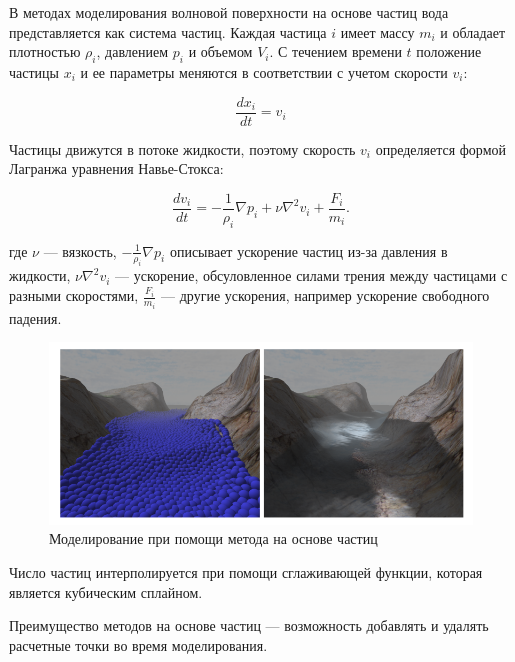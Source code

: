 В методах моделирования волновой поверхности на основе частиц вода представляется как система частиц. Каждая частица $i$ имеет массу $m_{i}$ и обладает плотностью $\rho _{i}$, давлением $p_{i}$ и объемом $V_{i}$. С течением времени $t$ положение частицы $x_{i}$ и ее параметры меняются в соответствии с учетом скорости $v_{i}$:

\begin{equation}
    \label{vi}
    \frac{dx_{i}}{dt} = v_{i}
\end{equation}

Частицы движутся в потоке жидкости, поэтому скорость $v_{i}$ определяется формой Лагранжа уравнения Навье-Стокса:

\begin{equation}
    \label{dv}
    \frac{dv_{i}}{dt} = -\frac{1}{\rho _{i}} \nabla p_{i} + \nu \nabla ^2 v_{i} + \frac{F_{i}}{m_{i}}.
\end{equation}

где $\nu$ --- вязкость, $-\frac{1}{\rho _{i}} \nabla p_{i}$ описывает ускорение частиц из-за давления в жидкости, $\nu \nabla ^2 v_{i}$ --- ускорение, обсуловленное силами трения между частицами с разными скоростями, $\frac{F_{i}}{m_{i}}$ --- другие ускорения, например ускорение свободного падения.

\begin{figure}[H]
	\begin{center}
		\includegraphics[scale=0.5]{img/particle.png}
	\end{center}
	\captionsetup{justification=centering}
	\caption{Моделирование при помощи метода на основе частиц}
	\label{img:particle}
\end{figure}

Число частиц интерполируется при помощи сглаживающей функции, которая является кубическим сплайном.

Преимущество методов на основе частиц --- возможность добавлять и удалять расчетные точки во время моделирования.

